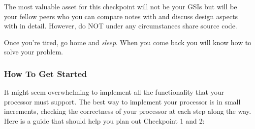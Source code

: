 \documentclass[11pt]{article}
\begin{document}
The most valuable asset for this checkpoint will not be your GSIs but will be your fellow peers who you can compare notes with and discuss design aspects with in detail.
However, do NOT under any circumstances share source code.

Once you're tired, go home and \textit{sleep}. When you come back you will know how to solve your problem.

\subsubsection{How To Get Started}
It might seem overwhelming to implement all the functionality that your processor must support. The best way to implement your processor is in small increments, checking the correctness of your processor at each step along the way. Here is a guide that should help you plan out Checkpoint 1 and 2:
\end{document}
